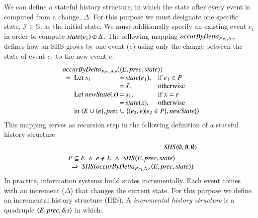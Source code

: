 \documentclass{elsarticle}
\def\id#1{\text{\em #1\/}}
\def\Events{{\mathit E}}
\begin{document}
	We can define a stateful history structure,
	in which the state after every event is computed from a change, $\Delta$.
	For this purpose we must designate one specific state, $\mathcal I\in\mathbb S$, as the initial state.
	We must additionally specify an existing event $e_1$ in order to compute $\id{state}(e_1)\oplus\Delta$.
	The following mapping $\id{occurByDelta}_{P,e_1,\Delta,e}$ defines how an SHS grows by one event ($e$)
	using only the change between the state of event $e_1$ to the new event $e$:
\begin{eqnarray}
&&\begin{array}{l}
	\id{occurByDelta}_{P,e_1,\Delta,e}(\la\Events, \id{prec}, \id{state}\ra)\\
	\ \ =\ \begin{array}[t]{@{}l@{\hspace{.2em}}c@{\hspace{.2em}}ll}
		\text{Let }s_1&=&\id{state}(e_1)\text{,}&\text{if }e_1\in P\\
				&=&\mathcal I\text{,}&\text{otherwise}\\
		\text{Let }\id{newState}(x)&=&s_1\text{,}&\text{if }x=e\\
		&=&\id{state}(x)\text{,}&\text{otherwise}\\
		\multicolumn{4}{@{}l}{\text{in }\la\Events\cup\{e\}, \id{prec}\cup\{(e_2,e)|e_2\in P\}, \id{newState}\}\ra}
		\end{array}
\end{array}
\label{req:SHS by Delta}
\end{eqnarray}
	This mapping serves as recursion step in the following definition of a stateful history structure
\begin{eqnarray}
	&&\id{SHS}\la \emptyset, \emptyset, \emptyset\ra\\
&&\begin{array}{@{}l}
	P\subseteq\Events\ \wedge\ e\notin E\ \wedge\ \id{SHS}\la \Events, \id{prec}, \id{state}\ra\\
	\ \ \Rightarrow\ \id{SHS}(\id{occurByDelta}_{P,e_1,\Delta,e}\la \Events, \id{prec}, \id{state}\ra)
\end{array}
\label{req:recursive def SHS by Delta}
\end{eqnarray}
	In practice, information systems build states incrementally.
	Each event comes with an increment ($\Delta$) that changes the current state.
	For this purpose we define an incremental history structure (IHS).
	A {\em incremental history structure} is a quadruple $\la\Events, \id{prec}, \delta, \iota\ra$ in which:
\end{document}
